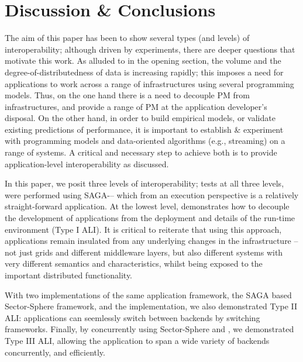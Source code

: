 \documentclass[3p,twocolumn]{elsarticle}
\begin{document}
\section{Discussion \& Conclusions}
\label{sec:discuss}

The aim of this paper has been to show several types (and levels) of
interoperability; although driven by experiments, there are deeper
questions that motivate this work.  As alluded to in the opening
section, the volume and the degree-of-distributedness of data is
increasing rapidly; this imposes a need for applications to work
across a range of infrastructures using several programming models.
Thus, on the one hand there is a need to decouple PM from
infrastructures, and provide a range of PM at the application
developer's disposal. On the other hand, in order to build empirical
models, or validate existing predictions of performance, it is
important to establish \& experiment with programming models and
data-oriented algorithms (e.g., streaming) on a range of
systems. %
A critical and necessary step to achieve both is to provide
application-level interoperability as discussed.

In this paper, we posit three levels of interoperability; tests at all
three levels, were performed using SAGA-\mr -- which from an execution
perspective is a relatively straight-forward application.  At the
lowest level, \sagamapreduce demonstrates how to decouple the
development of applications from the deployment and details of the
run-time environment (Type I ALI).  It is critical to reiterate that
using this approach, applications remain insulated from any underlying
changes in the infrastructure -- not just grids and different
middleware layers, but also different systems with very different
semantics and characteristics, whilst being exposed to the important
distributed functionality.

With two implementations of the same application framework, the SAGA
based Sector-Sphere framework, and the \smr implementation, we also
demonstrated Type II ALI: applications can seemlessly switch between
backends by switching frameworks.  Finally, by concurrently using
Sector-Sphere \mr and \smr, we demonstrated Type III ALI, allowing the
application to span a wide variety of backends concurrently, and
efficiently.
\end{document}
